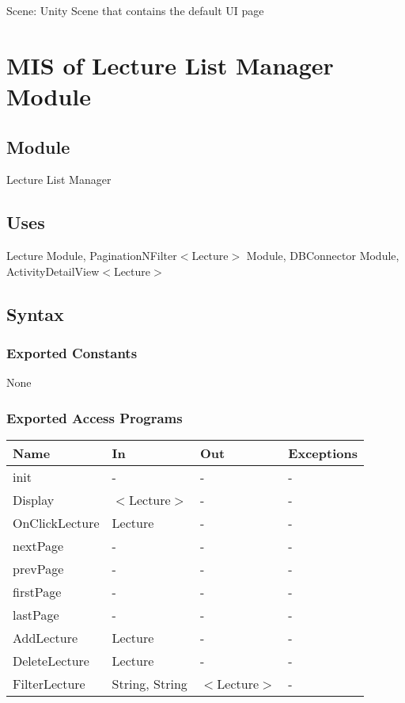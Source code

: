 \documentclass[12pt, titlepage]{article}
\begin{document}
Scene: Unity Scene that contains the default UI page

\newpage

\section{MIS of Lecture List Manager Module} \label{mLL}

\subsection{Module}

Lecture List Manager

\subsection{Uses}

Lecture Module, PaginationNFilter$<$Lecture$>$ Module, DBConnector Module,\\ ActivityDetailView$<$Lecture$>$

\subsection{Syntax}

\subsubsection{Exported Constants}
None

\subsubsection{Exported Access Programs}
\begin{center}
\begin{tabular}{p{4cm} p{2cm} p{4cm} p{4cm}}
\hline
\textbf{Name} & \textbf{In} & \textbf{Out} & \textbf{Exceptions} \\
\hline
init & - & - & -\\
Display & $<$Lecture$>$ & - & - \\
OnClickLecture & Lecture & - & -\\ 
nextPage & - & - &  -\\
prevPage & - & - &  -\\
firstPage & - & - &  -\\
lastPage & - & - &  -\\
AddLecture & Lecture & - & - \\
DeleteLecture & Lecture & - & - \\
FilterLecture & String, String & $<$Lecture$>$ & - \\
\hline
\end{tabular}
\end{center}
\end{document}
